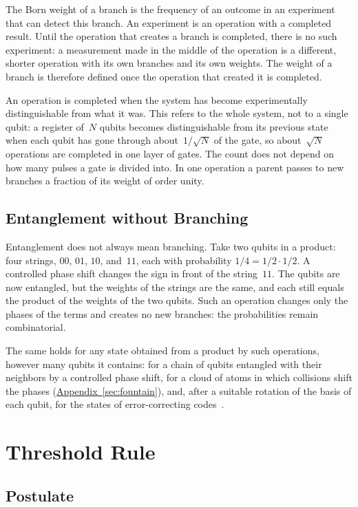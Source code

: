 \documentclass[11pt,a4paper]{article}
\newcommand{\CollapseRule}{Threshold Rule}
\begin{document}
The Born weight of a branch is the frequency of an outcome in an experiment that can detect this branch. An experiment is an operation with a completed result. Until the operation that creates a branch is completed, there is no such experiment: a measurement made in the middle of the operation is a different, shorter operation with its own branches and its own weights. The weight of a branch is therefore defined once the operation that created it is completed.

An operation is completed when the system has become experimentally distinguishable from what it was. This refers to the whole system, not to a single qubit: a register of~$N$ qubits becomes distinguishable from its previous state when each qubit has gone through about~$1/\sqrt N$ of the gate, so about~$\sqrt N$ operations are completed in one layer of gates. The count does not depend on how many pulses a gate is divided into. In one operation a parent passes to new branches a fraction of its weight of order unity.

\subsection{Entanglement without Branching}
\label{sec:phase}

Entanglement does not always mean branching. Take two qubits in a product: four strings, $00$, $01$, $10$, and~$11$, each with probability $1/4=1/2\cdot1/2$. A controlled phase shift changes the sign in front of the string~$11$. The qubits are now entangled, but the weights of the strings are the same, and each still equals the product of the weights of the two qubits. Such an operation changes only the phases of the terms and creates no new branches: the probabilities remain combinatorial.

The same holds for any state obtained from a product by such operations, however many qubits it contains: for a chain of qubits entangled with their neighbors by a controlled phase shift, for a cloud of atoms in which collisions shift the phases (\hyperref[sec:fountain]{Appendix~\ref*{sec:fountain}}), and, after a suitable rotation of the basis of each qubit, for the states of error-correcting codes~\cite{vandennest2004}.

\section{\CollapseRule}
\label{sec:rules}

\subsection{Postulate}
\label{sec:postulate}
\end{document}

